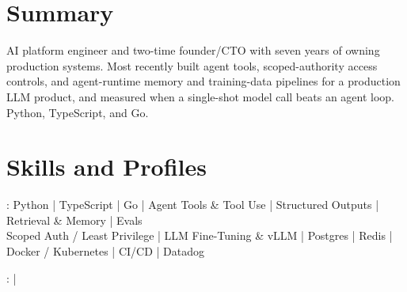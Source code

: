 \documentclass[print]{jack-resume}
\begin{document}
\pagecolor{darkmodeBackground}

%
%


\begin{minipage}[t][1cm][t]{.03\textwidth}
    \hfill
\end{minipage}


\section{Summary}
AI platform engineer and two-time founder/CTO with seven years of owning production systems. Most recently built agent tools, scoped-authority access controls, and agent-runtime memory and training-data pipelines for a production LLM product, and measured when a single-shot model call beats an agent loop. Python, TypeScript, and Go.
\sectionsep


\section{Skills and Profiles}
:
Python \hfill | \hfill
TypeScript \hfill | \hfill
Go \hfill | \hfill
Agent Tools \& Tool Use \hfill | \hfill
Structured Outputs \hfill | \hfill
Retrieval \& Memory \hfill | \hfill
Evals \\
\hspace{1.0cm} Scoped Auth / Least Privilege \hfill | \hfill
LLM Fine-Tuning \& vLLM \hfill | \hfill
Postgres \hfill | \hfill
Redis \hfill | \hfill
Docker / Kubernetes \hfill | \hfill
CI/CD \hfill | \hfill
Datadog \\

\raggedright{
    :
      \href{https://www.linkedin.com/in/jack-sturtevant/}{ \ExternalLink} |
     \href{https://github.com/jacksturt}{ \ExternalLink}}

\end{document}
